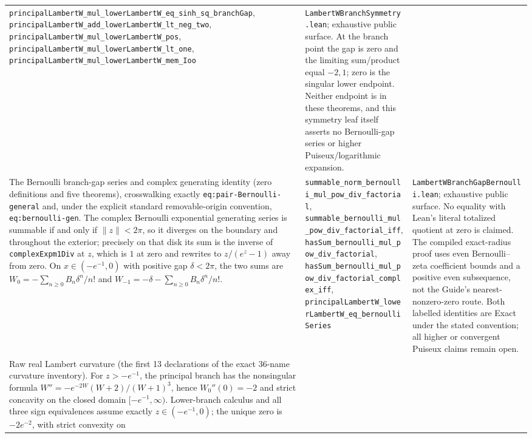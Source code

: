 \documentclass[11pt,oneside]{article}
\theoremstyle{definition}
\theoremstyle{remark}
\begin{document}
\begin{longtable}{@{}p{}p{}p{}@{}}
\nolinkurl{principalLambertW_mul_lowerLambertW_eq_sinh_sq_branchGap},
\nolinkurl{principalLambertW_add_lowerLambertW_lt_neg_two},
\nolinkurl{principalLambertW_mul_lowerLambertW_pos},
\nolinkurl{principalLambertW_mul_lowerLambertW_lt_one},
\nolinkurl{principalLambertW_mul_lowerLambertW_mem_Ioo} &
\nolinkurl{LambertWBranchSymmetry.lean}; exhaustive public surface.  At the
branch point the gap is zero and the limiting sum/product equal \(-2,1\);
zero is the singular lower endpoint.  Neither endpoint is in these theorems,
and this symmetry leaf itself asserts no Bernoulli-gap series or higher
Puiseux/logarithmic expansion. \\
The Bernoulli branch-gap series and complex generating identity
(zero definitions and five theorems), crosswalking exactly
\nolinkurl{eq:pair-Bernoulli-general} and, under the explicit standard
removable-origin convention, \nolinkurl{eq:bernoulli-gen}.  The complex
Bernoulli exponential generating series is summable if and only if
\(\lVert z\rVert<2\pi\), so it diverges on the boundary and throughout the
exterior; precisely on that disk its sum is the inverse of
\nolinkurl{complexExpm1Div} at \(z\), which is \(1\) at zero and rewrites to
\(z/(e^z-1)\) away from zero.  On
\(x\in(-e^{-1},0)\) with positive gap \(\delta<2\pi\), the two sums are
\(W_0=-\sum_{n\geq0}B_n\delta^n/n!\) and
\(W_{-1}=-\delta-\sum_{n\geq0}B_n\delta^n/n!\). &
\nolinkurl{summable_norm_bernoulli_mul_pow_div_factorial},
\nolinkurl{summable_bernoulli_mul_pow_div_factorial_iff},
\nolinkurl{hasSum_bernoulli_mul_pow_div_factorial},
\nolinkurl{hasSum_bernoulli_mul_pow_div_factorial_complex_iff},
\nolinkurl{principalLambertW_lowerLambertW_eq_bernoulliSeries} &
\nolinkurl{LambertWBranchGapBernoulli.lean}; exhaustive public surface.
No equality with Lean's literal totalized quotient at zero is claimed.  The
compiled exact-radius proof uses even Bernoulli--zeta coefficient bounds and
a positive even subsequence, not the Guide's nearest-nonzero-zero route.  Both
labelled identities are Exact under the stated convention; all higher or
convergent Puiseux claims remain open. \\
Raw real Lambert curvature (the first 13 declarations of the exact 36-name
curvature inventory).  For \(z>-e^{-1}\), the principal branch has the
nonsingular formula
\(W''=-e^{-2W}(W+2)/(W+1)^3\), hence \(W_0''(0)=-2\) and strict concavity
on the closed domain \([-e^{-1},\infty)\).  Lower-branch calculus and all
three sign equivalences assume exactly \(z\in(-e^{-1},0)\); the unique zero is
\(-2e^{-2}\), with strict convexity on

\end{longtable}
\end{document}
